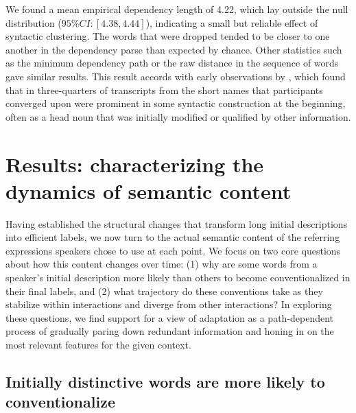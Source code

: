 \documentclass[alpha-refs]{wiley-article}
\begin{document}
We found a mean empirical dependency length of 4.22, which lay outside the null distribution ($95\% CI: [4.38, 4.44]$), indicating a small but reliable effect of syntactic clustering.
The words that were dropped tended to be closer to one another in the dependency parse than expected by chance.
Other statistics such as the minimum dependency path or the raw distance in the sequence of words gave similar results.
This result accords with early observations by \cite{Carroll80_NamingHedges}, which found that in three-quarters of transcripts from \cite{KraussWeinheimer64_ReferencePhrases} the short names that participants converged upon were prominent in some syntactic construction at the beginning, often as a head noun that was initially modified or qualified by other information. 

\section{Results: characterizing the dynamics of semantic content}
\label{sec:content} 

Having established the structural changes that transform long initial descriptions into efficient labels, we now turn to the actual semantic content of the referring expressions speakers chose to use at each point. 
We focus on two core questions about how this content changes over time: (1) why are some words from a speaker's initial description more likely than others to become conventionalized in their final labels, and (2) what trajectory do these conventions take as they stabilize within interactions and diverge from other interactions?
In exploring these questions, we find support for a view of adaptation as a path-dependent process of gradually paring down redundant information and honing in on the most relevant features for the given context.

\subsection{Initially distinctive words are more likely to conventionalize}
\label{sec:distinctive}
\end{document}
